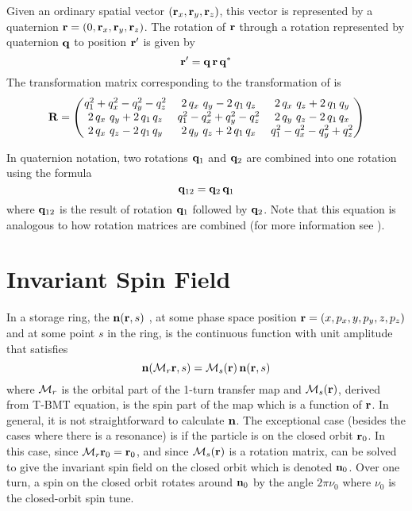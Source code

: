{Given an ordinary spatial vector $({\bf r}_x, {\bf r}_y, {\bf r}_z)$, this vector is represented by a
quaternion ${\bf r} = (0, {\bf r}_x, {\bf r}_y, {\bf r}_z)$. The rotation of ${\bf r}$ through a rotation
represented by quaternion ${\bf q}$ to position ${\bf r}'$ is given by
\begin{equation}
  {\bf r}' = {\bf q} \, {\bf r} \, {\bf q}^*
  \label{rqrq}
\end{equation}
The transformation matrix corresponding to the transformation of  is
\begin{equation}
  {\bf R} = \begin{pmatrix}
    q_1^2 + q_x^2 - q_y^2 - q_z^2    & 2 \, q_x \ q_y - 2 \, q_1 \, q_z & 2 \, q_x \ q_z + 2 \, q_1 \, q_y \\
    2 \, q_x \ q_y + 2 \, q_1 \, q_z & q_1^2 - q_x^2 + q_y^2 - q_z^2    & 2 \, q_y \ q_z - 2 \, q_1 \, q_x \\
    2 \, q_x \ q_z - 2 \, q_1 \, q_y & 2 \, q_y \ q_z + 2 \, q_1 \, q_x & q_1^2 - q_x^2 - q_y^2 + q_z^2 
  \end{pmatrix}
  \label{rqqq}
\end{equation}

In quaternion notation, two rotations ${\bf q}_1$ and ${\bf q}_2$ are combined into one rotation using the formula
\begin{equation}
  {\bf q}_{12} = {\bf q}_2 \, {\bf q}_1
\end{equation}
where ${\bf q}_{12}$ is the result of rotation ${\bf q}_1$ followed by ${\bf q}_2$. Note that this equation
is analogous to how rotation matrices are combined (for more information see \cite{b:quat}).

\section{Invariant Spin Field}
\label{s:isf}

In a storage ring, the  ${\bf n}({\bf r}, s)$
\cite{b:spin.hoff,b:duan15}, at some phase space position ${\bf r} = (x, p_x, y, p_y, z, p_z)$ and at
some point $s$ in the ring, is the continuous function with unit amplitude that satisfies
\begin{equation}
  {\bf n}({\cal M}_r {\bf r}, s) = {\cal M}_s({\bf r}) \, {\bf n}({\bf r}, s)
  \label{nmrs}
\end{equation}
where ${\cal M}_r$ is the orbital part of the 1-turn transfer map and ${\cal M}_s({\bf r})$, derived from
T-BMT equation, is the spin part of the map which is a function of ${\bf r}$. In general, it is not
straightforward to calculate ${\bf n}$. The exceptional case (besides the cases where there is a
resonance) is if the particle is on the closed orbit ${\bf r}_0$. In this case, since ${\cal M}_r {\bf r}_0
= {\bf r}_0$, and since ${\cal M}_s({\bf r})$ is a rotation matrix,  can be solved to give the
invariant spin field on the closed orbit which is denoted ${\bf n}_0$.  Over one turn, a spin on the
closed orbit rotates around ${\bf n}_0$ by the angle $2 \pi \nu_0$ where $\nu_0$ is the closed-orbit
spin tune.

}
